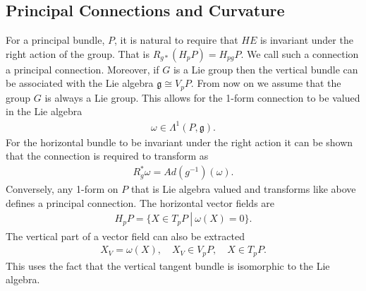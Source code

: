 \documentclass[10pt]{report}
\theoremstyle{definition}
\begin{document}
\subsection{Principal Connections and Curvature}
For a principal bundle, $P$, it is natural to require that $HE$ is invariant under the right action of the group. That is $R_{g*}(H_p P) = H_{pg} P$. We call such a connection a principal connection. Moreover, if $G$ is a Lie group then the vertical bundle can be associated with the Lie algebra $\mathfrak{g} \cong V_p P$. From now on we assume that the group $G$ is always a Lie group. This allows for the 1-form connection to be valued in the Lie algebra
\begin{align}
    \omega \in \Lambda^1(P,\mathfrak{g}).
\end{align}
For the horizontal bundle to be invariant under the right action it can be shown that the connection is required to transform as
\begin{align}
    R^*_g \omega = Ad(g^{-1})(\omega).
\end{align}
Conversely, any 1-form on $P$ that is Lie algebra valued and transforms like above defines a principal connection. The horizontal vector fields are
\begin{align}
    H_p P = \{\left. X \in T_p P\ \right|\ \omega(X) = 0 \}.
\end{align}
The vertical part of a vector field can also be extracted 
\begin{align}
    X_V = \omega(X),\quad X_V \in V_p P,\quad X \in T_p P.
\end{align}
This uses the fact that the vertical tangent bundle is isomorphic to the Lie algebra.
\end{document}
